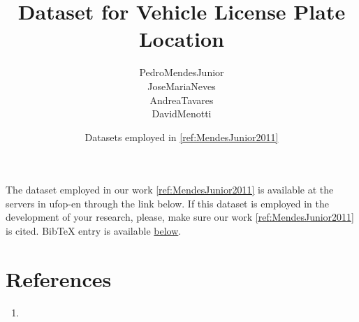 

% 

\title{Dataset for Vehicle License Plate Location}
\author{\gls{PedroMendesJunior}\\%
  \gls{JoseMariaNeves}\\%
  \gls{AndreaTavares}\\%
  \gls{DavidMenotti}\\%
}
\date{Datasets employed in \ref{ref:MendesJunior2011}}




\maketitle

The dataset employed in our work \ref{ref:MendesJunior2011} is available at the servers in \gls{ufop-en} through the link below.
If this dataset is employed in the development of your research, please, make sure our work \ref{ref:MendesJunior2011} is cited.
BibTeX entry is available \hyperref[ref:MendesJunior2011]{below}.


\section*{References}

\begin{enumerate}
\item{}
\end{enumerate}




